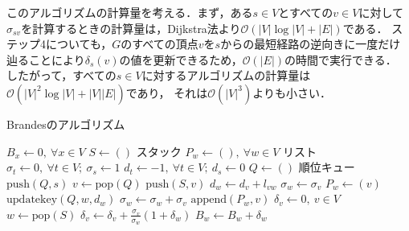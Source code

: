 このアルゴリズムの計算量を考える．まず，ある$s\in V$とすべての$v\in V$に対して
$\sigma_{sv}$を計算するときの計算量は，Dijkstra法より$\mathcal{O}(|V|\log |V|+|E|)$である．
ステップ4についても，$G$のすべての頂点$v$を$s$からの最短経路の逆向きに一度だけ辿ることにより$\delta_s(v)$の値を更新できるため，$\mathcal{O}(|E|)$の時間で実行できる\cite{Brandes2001}．
したがって，すべての$s\in V$に対するアルゴリズムの計算量は$\mathcal{O}(|V|^2\log |V|+|V||E|)$であり，
それは$\mathcal{O}(|V|^3)$よりも小さい．

\begin{algorithm}[H]
  \caption{Brandesのアルゴリズム}
  \label{algo:brandes}
  \begin{multicols}{2}
    \begin{algorithmic}[1]\small
      \State $B_x\gets 0,\:\forall x\in V$
      \State $S\gets()$ \Comment スタック
      \State $P_w\gets (),\:\forall w\in V$ \Comment リスト
      \State $\sigma_t\gets 0,\:\forall t\in V;\:\sigma_s\gets 1$
      \State $d_t\gets -1,\:\forall t\in V;\:d_s\gets 0$
      \State $Q\gets ()$ \Comment 順位キュー
      \State $\mathrm{push}(Q, s)$
      \State $v\gets\mathrm{pop}(Q)$
      \State $\mathrm{push}(S, v)$
      \State $d_w\gets d_v+l_{vw}$
      \State $\sigma_w\gets\sigma_v$
      \State $P_w\gets(v)$
      \State $\mathrm{updatekey}(Q, w, d_w)$
      \EndIf
      \State $\sigma_w\gets\sigma_w+\sigma_v$
      \State $\mathrm{append}(P_w, v)$
      \EndIf
      \EndFor
      \EndWhile
      \State $\delta_v\gets 0,\:v\in V$
      \State $w\gets\mathrm{pop}(S)$
      \State $\delta_v\gets\delta_v+\frac{\sigma_v}{\sigma_w}(1+\delta_w)$
      \EndFor
      \State $B_w\gets B_w+\delta_w$
      \EndIf
      \EndWhile
      \EndFor
      \EndProcedure
    \end{algorithmic}
  \end{multicols}
\end{algorithm}

